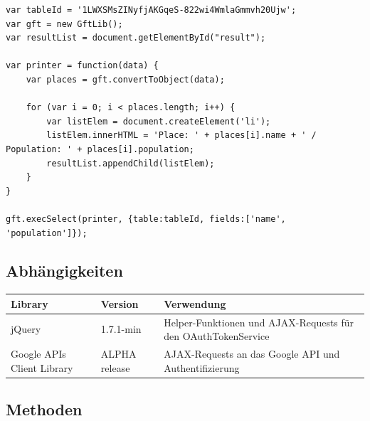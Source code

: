\lstset{language=JavaScript}
\begin{lstlisting}
var tableId = '1LWXSMsZINyfjAKGqeS-822wi4WmlaGmmvh20Ujw';
var gft = new GftLib();
var resultList = document.getElementById("result");

var printer = function(data) {
	var places = gft.convertToObject(data);

	for (var i = 0; i < places.length; i++) {
		var listElem = document.createElement('li');
		listElem.innerHTML = 'Place: ' + places[i].name + ' / Population: ' + places[i].population;
		resultList.appendChild(listElem);
	}
}

gft.execSelect(printer, {table:tableId, fields:['name', 'population']});
\end{lstlisting}

\subsection{Abhängigkeiten}
\begin{longtable}{|p{0.3\threecelltabwidth}|p{0.2\threecelltabwidth}|p{0.5\threecelltabwidth}|}
\hline 
\textbf{Library} & \textbf{Version} & \textbf{Verwendung} \\ 
\hline 
jQuery & 1.7.1-min & Helper-Funktionen und \gls{AJAX}-Requests für den OAuthTokenService  \\ 
\hline 
Google APIs Client Library & ALPHA release & \gls{AJAX}-Requests an das Google API und Authentifizierung \\ 
\hline 
\end{longtable} 

\subsection{Methoden}
